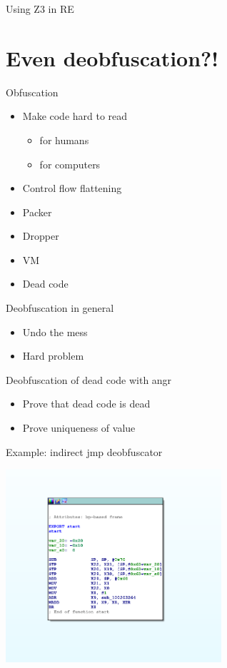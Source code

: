 \documentclass[10pt, compress, aspectratio=169]{beamer}
\begin{document}
\begin{frame}{Using Z3 in RE}
\section{Even deobfuscation?!}
\end{frame}

\begin{frame}{Obfuscation}
  \begin{itemize}
    \item Make code hard to read
    \begin{itemize}
      \item for humans
      \item for computers
    \end{itemize}
    \item Control flow flattening
    \item Packer
    \item Dropper
    \item VM
    \item Dead code
  \end{itemize}
\end{frame}

\begin{frame}{Deobfuscation in general}
  \begin{itemize}
    \item Undo the mess
    \item Hard problem
  \end{itemize}
\end{frame}

\begin{frame}{Deobfuscation of dead code with angr}
  \begin{itemize}
    \item Prove that dead code is dead
    \item Prove uniqueness of value
  \end{itemize}
\end{frame}

\begin{frame}{Example: indirect jmp deobfuscator}
\begin{center}
  \includegraphics[width=0.6\textwidth]{images/deobf-1-ida1.png}
 \end{center}
\end{frame}
\end{document}
